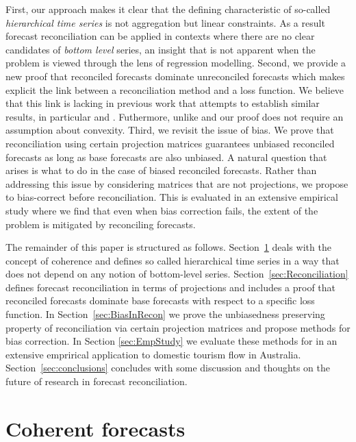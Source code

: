 \documentclass[12pt]{article}
\theoremstyle{definition}
\theoremstyle{property}
\begin{document}
	First, our approach makes it clear that the defining characteristic of so-called {\em hierarchical time series} is not aggregation but linear constraints.  As a result forecast reconciliation can be applied in contexts where there are no clear candidates of {\em bottom level} series, an insight that is not apparent when the problem is viewed through the lens of regression modelling.  Second, we provide a new proof that reconciled forecasts dominate unreconciled forecasts which makes explicit the link between a reconciliation method and a loss function.  We believe that this link is lacking in previous work that attempts to establish similar results, in particular \cite{VanErven2015a} and \cite{WicEtAl2019}.  Futhermore, unlike \cite{VanErven2015a} and \cite{WicEtAl2019} our proof does not require an assumption about convexity.  Third, we revisit the issue of bias.  We prove that reconciliation using certain projection matrices guarantees unbiased reconciled forecasts as long as base forecasts are also unbiased.  A natural question that arises is what to do in the case of biased reconciled forecasts.  Rather than addressing this issue by considering matrices that are not projections, we propose to bias-correct before reconciliation.  This is evaluated in an extensive empirical study where we find that even when bias correction fails, the extent of the problem is mitigated by reconciling forecasts.
	
	
	The remainder of this paper is structured as follows. Section~\ref{sec:CoheForecasts} deals with the concept of coherence and defines so called hierarchical time series in a way that does not depend on any notion of bottom-level series.  Section~\ref{sec:Reconciliation} defines forecast reconciliation in terms of projections and includes a proof that reconciled forecasts dominate base forecasts with respect to a specific loss function. In Section~\ref{sec:BiasInRecon} we prove the unbiasedness preserving property of reconciliation via certain projection matrices and propose methods for bias correction. In Section \ref{sec:EmpStudy} we evaluate these methods for in an extensive emprirical application to domestic tourism flow in Australia.  Section~\ref{sec:conclusions} concludes with some discussion and thoughts on the  future of research in forecast reconciliation.
\section{Coherent forecasts}\label{sec:CoheForecasts}
	
\end{document}
